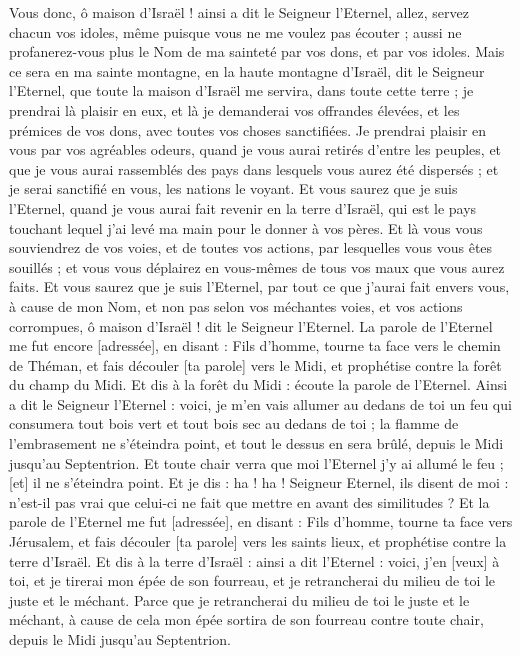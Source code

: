 \begin{multicols}{2}
Vous donc, ô maison d'Israël ! ainsi a dit le Seigneur l'Eternel, allez, servez chacun vos idoles, même puisque vous ne me voulez pas écouter ; aussi ne profanerez-vous plus le Nom de ma sainteté par vos dons, et par vos idoles.
Mais ce sera en ma sainte montagne, en la haute montagne d'Israël, dit le Seigneur l'Eternel, que toute la maison d'Israël me servira, dans toute cette terre ; je prendrai là plaisir en eux, et là je demanderai vos offrandes élevées, et les prémices de vos dons, avec toutes vos choses sanctifiées.
Je prendrai plaisir en vous par vos agréables odeurs, quand je vous aurai retirés d'entre les peuples, et que je vous aurai rassemblés des pays dans lesquels vous aurez été dispersés ; et je serai sanctifié en vous, les nations le voyant.
Et vous saurez que je suis l'Eternel, quand je vous aurai fait revenir en la terre d'Israël, qui est le pays touchant lequel j'ai levé ma main pour le donner à vos pères.
Et là vous vous souviendrez de vos voies, et de toutes vos actions, par lesquelles vous vous êtes souillés ; et vous vous déplairez en vous-mêmes de tous vos maux que vous aurez faits.
Et vous saurez que je suis l'Eternel, par tout ce que j'aurai fait envers vous, à cause de mon Nom, et non pas selon vos méchantes voies, et vos actions corrompues, ô maison d'Israël ! dit le Seigneur l'Eternel.
\VerseOne{}La parole de l'Eternel me fut encore [adressée], en disant :
Fils d'homme, tourne ta face vers le chemin de Théman, et fais découler [ta parole] vers le Midi, et prophétise contre la forêt du champ du Midi.
Et dis à la forêt du Midi : écoute la parole de l'Eternel. Ainsi a dit le Seigneur l'Eternel : voici, je m'en vais allumer au dedans de toi un feu qui consumera tout bois vert et tout bois sec au dedans de toi ; la flamme de l'embrasement ne s'éteindra point, et tout le dessus en sera brûlé, depuis le Midi jusqu'au Septentrion.
Et toute chair verra que moi l'Eternel j'y ai allumé le feu ; [et] il ne s'éteindra point.
Et je dis : ha ! ha ! Seigneur Eternel, ils disent de moi : n'est-il pas vrai que celui-ci ne fait que mettre en avant des similitudes ?
Et la parole de l'Eternel me fut [adressée], en disant :
Fils d'homme, tourne ta face vers Jérusalem, et fais découler [ta parole] vers les saints lieux, et prophétise contre la terre d'Israël.
Et dis à la terre d'Israël : ainsi a dit l'Eternel : voici, j'en [veux] à toi, et je tirerai mon épée de son fourreau, et je retrancherai du milieu de toi le juste et le méchant.
Parce que je retrancherai du milieu de toi le juste et le méchant, à cause de cela mon épée sortira de son fourreau contre toute chair, depuis le Midi jusqu'au Septentrion.

\end{multicols}
